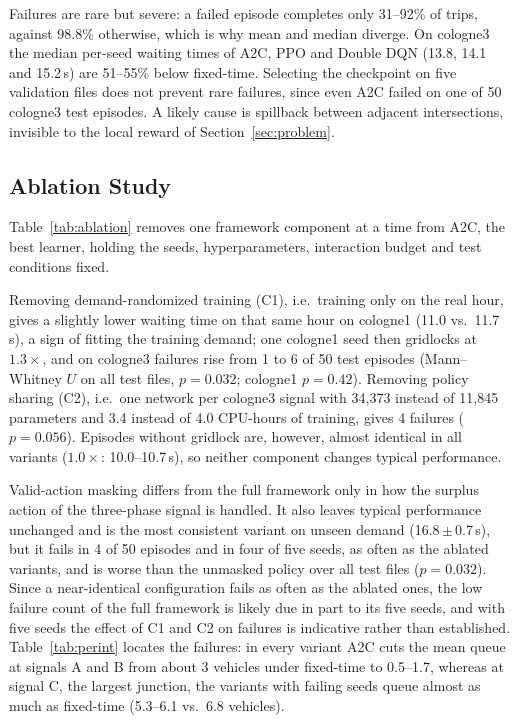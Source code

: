 Failures are rare but severe: a failed episode completes only 31--92\% of trips, against 98.8\% otherwise, which is why mean and median diverge. On cologne3 the median per-seed waiting times of A2C, PPO and Double DQN (13.8, 14.1 and 15.2\,s) are 51--55\% below fixed-time. Selecting the checkpoint on five validation files does not prevent rare failures, since even A2C failed on one of 50 cologne3 test episodes. A likely cause is spillback between adjacent intersections, invisible to the local reward of Section~\ref{sec:problem}.

\subsection{Ablation Study}
\label{sec:ablation}
Table~\ref{tab:ablation} removes one framework component at a time from A2C, the best learner, holding the seeds, hyperparameters, interaction budget and test conditions fixed.

Removing demand-randomized training (C1), i.e.\ training only on the real hour, gives a slightly lower waiting time on that same hour on cologne1 (11.0 vs.\ 11.7\,s), a sign of fitting the training demand; one cologne1 seed then gridlocks at $1.3\times$, and on cologne3 failures rise from 1 to 6 of 50 test episodes (Mann--Whitney $U$ on all test files, $p=0.032$; cologne1 $p=0.42$). Removing policy sharing (C2), i.e.\ one network per cologne3 signal with 34{,}373 instead of 11{,}845 parameters and 3.4 instead of 4.0 CPU-hours of training, gives 4 failures ($p=0.056$). Episodes without gridlock are, however, almost identical in all variants ($1.0\times$: 10.0--10.7\,s), so neither component changes typical performance.

Valid-action masking differs from the full framework only in how the surplus action of the three-phase signal is handled. It also leaves typical performance unchanged and is the most consistent variant on unseen demand (16.8\,$\pm$\,0.7\,s), but it fails in 4 of 50 episodes and in four of five seeds, as often as the ablated variants, and is worse than the unmasked policy over all test files ($p=0.032$). Since a near-identical configuration fails as often as the ablated ones, the low failure count of the full framework is likely due in part to its five seeds, and with five seeds the effect of C1 and C2 on failures is indicative rather than established. Table~\ref{tab:perint} locates the failures: in every variant A2C cuts the mean queue at signals A and B from about 3 vehicles under fixed-time to 0.5--1.7, whereas at signal C, the largest junction, the variants with failing seeds queue almost as much as fixed-time (5.3--6.1 vs.\ 6.8 vehicles).

